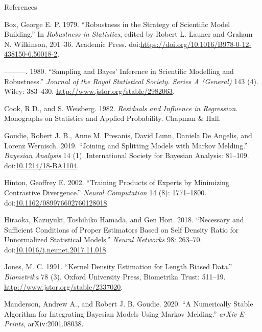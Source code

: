 \documentclass[10pt,ignorenonframetext,]{beamer}
\begin{document}
\begin{frame}[allowframebreaks]{References}

\hypertarget{refs}{}
\hypertarget{ref-box:79}{}
Box, George E. P. 1979. ``Robustness in the Strategy of Scientific Model
Building.'' In \emph{Robustness in Statistics}, edited by Robert L.
Launer and Graham N. Wilkinson, 201--36. Academic Press.
doi:\href{https://doi.org/https://doi.org/10.1016/B978-0-12-438150-6.50018-2}{https://doi.org/10.1016/B978-0-12-438150-6.50018-2}.

\hypertarget{ref-box:80}{}
---------. 1980. ``Sampling and Bayes' Inference in Scientific Modelling
and Robustness.'' \emph{Journal of the Royal Statistical Society. Series
A (General)} 143 (4). Wiley: 383--430.
\url{http://www.jstor.org/stable/2982063}.

\hypertarget{ref-cook:weisberg:82}{}
Cook, R.D., and S. Weisberg. 1982. \emph{Residuals and Influence in
Regression}. Monographs on Statistics and Applied Probability. Chapman
\& Hall.

\hypertarget{ref-goudie:etal:18}{}
Goudie, Robert J. B., Anne M. Presanis, David Lunn, Daniela De Angelis,
and Lorenz Wernisch. 2019. ``Joining and Splitting Models with Markov
Melding.'' \emph{Bayesian Analysis} 14 (1). International Society for
Bayesian Analysis: 81--109.
doi:\href{https://doi.org/10.1214/18-BA1104}{10.1214/18-BA1104}.

\hypertarget{ref-hinton:02}{}
Hinton, Geoffrey E. 2002. ``Training Products of Experts by Minimizing
Contrastive Divergence.'' \emph{Neural Computation} 14 (8): 1771--1800.
doi:\href{https://doi.org/10.1162/089976602760128018}{10.1162/089976602760128018}.

\hypertarget{ref-hiraoka:hamada:hori:18}{}
Hiraoka, Kazuyuki, Toshihiko Hamada, and Gen Hori. 2018. ``Necessary and
Sufficient Conditions of Proper Estimators Based on Self Density Ratio
for Unnormalized Statistical Models.'' \emph{Neural Networks} 98:
263--70.
doi:\href{https://doi.org/10.1016/j.neunet.2017.11.018}{10.1016/j.neunet.2017.11.018}.

\hypertarget{ref-jones:91}{}
Jones, M. C. 1991. ``Kernel Density Estimation for Length Biased Data.''
\emph{Biometrika} 78 (3). Oxford University Press, Biometrika Trust:
511--19. \url{http://www.jstor.org/stable/2337020}.

\hypertarget{ref-manderson:goudie:20}{}
Manderson, Andrew A., and Robert J. B. Goudie. 2020. ``A Numerically
Stable Algorithm for Integrating Bayesian Models Using Markov Melding.''
\emph{arXiv E-Prints}, arXiv:2001.08038.


\end{frame}
\end{document}
